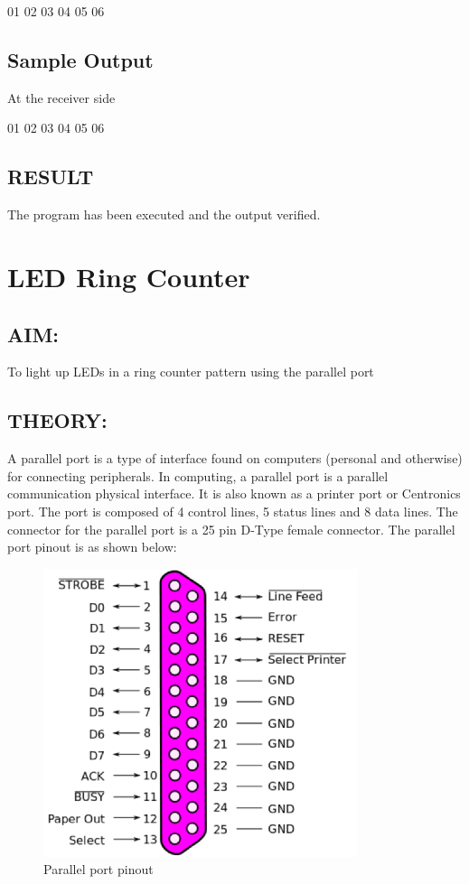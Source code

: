 \documentclass[a4paper,28pt]{report}
\begin{document}
01 02 03 04 05 06

\section*{Sample Output}
At the receiver side

01 02 03 04 05 06

\section*{RESULT }
The program has been executed and the output verified.
%
\newpage
\chapter{LED Ring Counter}
%
%
%
\section*{AIM:}
To light up LEDs in a ring counter pattern using the parallel port
\section*{THEORY:}
A parallel port is a type of interface found on computers (personal and otherwise) for connecting peripherals. In computing, a parallel port is a parallel communication physical interface. It is also known as a printer port or Centronics port. The port is composed of 4 control lines, 5 status lines and 8 data lines. The connector for the parallel port is a 25 pin D-Type female connector. The parallel port pinout is as shown below:

\begin{figure}[h]
\centering
\includegraphics[scale=0.5]{parallel-port-pinout}
\caption{Parallel port pinout}
\end{figure}
\end{document}
